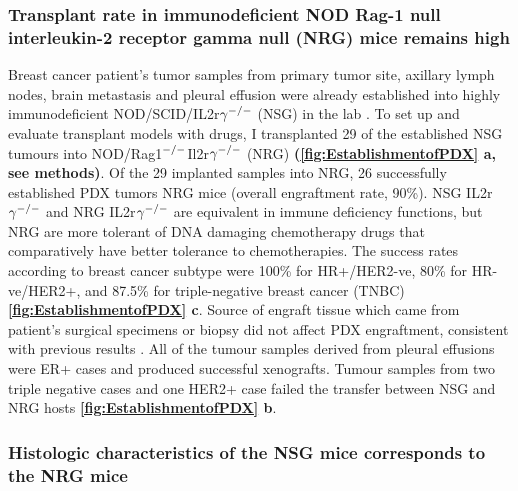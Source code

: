 \subsubsection{Transplant rate in immunodeficient NOD Rag-1 null interleukin-2 receptor gamma null (NRG) mice remains high}

Breast cancer patient's tumor samples from primary tumor site, axillary lymph nodes, brain metastasis and pleural effusion were already established into highly immunodeficient NOD/SCID/IL2r$\gamma^{\small{-/-}}$ (NSG) in the lab \cite{eirew2015dynamics}. 
To set up and evaluate transplant models with drugs, I transplanted 29 of the established NSG tumours into NOD/Rag1$^{\small{-/-}}$Il2r$\gamma ^{\small{-/-}}$ (NRG) \cite{pearson2008non} \textbf{(\autoref{fig:EstablishmentofPDX} a, see methods)}.
Of the 29 implanted samples into NRG, 26 successfully established PDX tumors NRG mice (overall engraftment rate, 90\%). NSG IL2r$\gamma^{\small{-/-}}$ and NRG IL2r$\gamma^{\small{-/-}}$ are equivalent in immune deficiency functions, but NRG are more tolerant of DNA damaging chemotherapy drugs that comparatively have better tolerance to chemotherapies. 
The success rates according to breast cancer subtype were 100\% for HR+/HER2-ve, 80\% for HR-ve/HER2+, and 87.5\% for triple-negative breast cancer (TNBC) \textbf{\autoref{fig:EstablishmentofPDX} c}. Source of engraft tissue which came from patient's surgical specimens or biopsy did not affect PDX engraftment, consistent with previous results \cite{ryu2019integrative}. 
All of the tumour samples derived from pleural effusions were ER+ cases and produced successful xenografts. Tumour samples from two triple negative cases and one HER2+ case failed the transfer between NSG and NRG hosts \textbf{\autoref{fig:EstablishmentofPDX} b}.


\subsubsection{Histologic characteristics of the NSG mice corresponds to the NRG mice}

